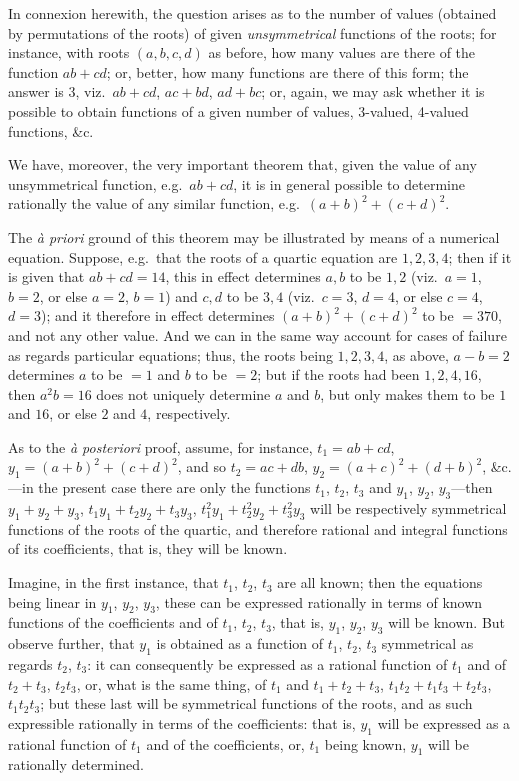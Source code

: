 \documentclass[12pt,a4paper]{article}
\begin{document}
In connexion herewith, the question arises as to the number of values (obtained by permutations of the roots) of given \textit{unsymmetrical} functions of the roots; for instance, with roots $(a, b, c, d)$ as before, how many values are there of the function $ab + cd$; or, better, how many functions are there of this form; the answer is 3, viz.\ $ab + cd$, $ac + bd$, $ad + bc$; or, again, we may ask whether it is possible to obtain functions of a given number of values, 3-valued, 4-valued functions, \&c.

We have, moreover, the very important theorem that, given the value of any unsymmetrical function, e.g.\ $ab + cd$, it is in general possible to determine rationally the value of any similar function, e.g.\ $(a + b)^2 + (c + d)^2$.

The \textit{\`a priori} ground of this theorem may be illustrated by means of a numerical equation. Suppose, e.g.\ that the roots of a quartic equation are $1, 2, 3, 4$; then if it is given that $ab + cd = 14$, this in effect determines $a, b$ to be $1, 2$ (viz.\ $a = 1$, $b = 2$, or else $a = 2$, $b = 1$) and $c, d$ to be $3, 4$ (viz.\ $c = 3$, $d = 4$, or else $c = 4$, $d = 3$); and it therefore in effect determines $(a + b)^2 + (c + d)^2$ to be $= 370$, and not any other value. And we can in the same way account for cases of failure as regards particular equations; thus, the roots being $1, 2, 3, 4$, as above, $a - b = 2$ determines $a$ to be $= 1$ and $b$ to be $= 2$; but if the roots had been $1, 2, 4, 16$, then $a^2 b = 16$ does not uniquely determine $a$ and $b$, but only makes them to be $1$ and $16$, or else $2$ and $4$, respectively.

As to the \textit{\`a posteriori} proof, assume, for instance, $t_1 = ab + cd$, $y_1 = (a + b)^2 + (c + d)^2$, and so $t_2 = ac + db$, $y_2 = (a + c)^2 + (d + b)^2$, \&c.---in the present case there are only the functions $t_1$, $t_2$, $t_3$ and $y_1$, $y_2$, $y_3$---then $y_1 + y_2 + y_3$, $t_1 y_1 + t_2 y_2 + t_3 y_3$, $t_1^2 y_1 + t_2^2 y_2 + t_3^2 y_3$ will be respectively symmetrical functions of the roots of the quartic, and therefore rational and integral functions of its coefficients, that is, they will be known.

Imagine, in the first instance, that $t_1$, $t_2$, $t_3$ are all known; then the equations being linear in $y_1$, $y_2$, $y_3$, these can be expressed rationally in terms of known functions of the coefficients and of $t_1$, $t_2$, $t_3$, that is, $y_1$, $y_2$, $y_3$ will be known. But observe further, that $y_1$ is obtained as a function of $t_1$, $t_2$, $t_3$ symmetrical as regards $t_2$, $t_3$: it can consequently be expressed as a rational function of $t_1$ and of $t_2 + t_3$, $t_2 t_3$, or, what is the same thing, of $t_1$ and $t_1 + t_2 + t_3$, $t_1 t_2 + t_1 t_3 + t_2 t_3$, $t_1 t_2 t_3$; but these last will be symmetrical functions of the roots, and as such expressible rationally in terms of the coefficients: that is, $y_1$ will be expressed as a rational function of $t_1$ and of the coefficients, or, $t_1$ being known, $y_1$ will be rationally determined.
\end{document}
